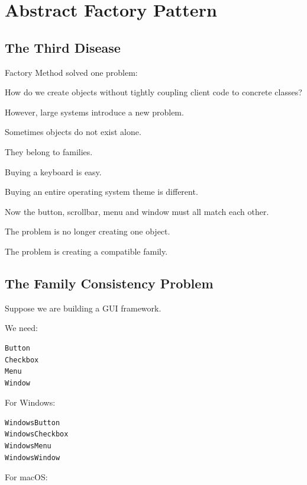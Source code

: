 \documentclass[11pt,a4paper]{book}
\begin{document}
\chapter{Abstract Factory Pattern}

\section{The Third Disease}

\begin{idea}

Factory Method solved one problem:

How do we create objects without tightly coupling
client code to concrete classes?

However, large systems introduce a new problem.

Sometimes objects do not exist alone.

They belong to families.

\end{idea}

\begin{mentalmodel}

Buying a keyboard is easy.

Buying an entire operating system theme is different.

Now the button, scrollbar, menu and window
must all match each other.

The problem is no longer creating one object.

The problem is creating a compatible family.

\end{mentalmodel}
\section{The Family Consistency Problem}

Suppose we are building a GUI framework.

We need:

\begin{verbatim}
Button
Checkbox
Menu
Window
\end{verbatim}

For Windows:

\begin{verbatim}
WindowsButton
WindowsCheckbox
WindowsMenu
WindowsWindow
\end{verbatim}

For macOS:
\end{document}
